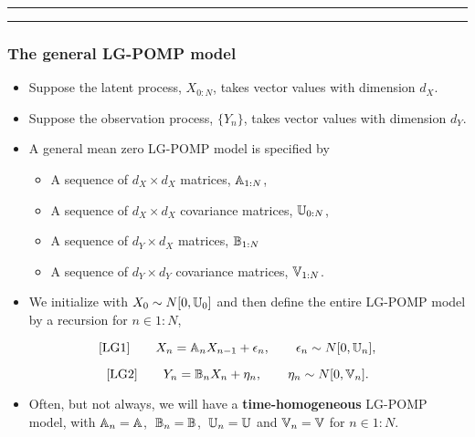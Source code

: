 \documentclass[]{article}
\providecommand{\tightlist}{%
  \setlength{\itemsep}{0pt}\setlength{\parskip}{0pt}}
\begin{document}
\begin{center}\rule{0.5\linewidth}{\linethickness}\end{center}

\begin{center}\rule{0.5\linewidth}{\linethickness}\end{center}

\subsubsection{The general LG-POMP
model}\label{the-general-lg-pomp-model}

\begin{itemize}
\item
  Suppose the latent process, \(X_{0:N}\), takes vector values with
  dimension \(d_X\).
\item
  Suppose the observation process, \(\{Y_n\}\), takes vector values with
  dimension \(d_Y\).
\item
  A general mean zero LG-POMP model is specified by

  \begin{itemize}
  \item
    A sequence of \(d_X\times d_X\) matrices, \(\mathbb{A}_{1:N}\),
  \item
    A sequence of \(d_X\times d_X\) covariance matrices,
    \(\mathbb{U}_{0:N}\),
  \item
    A sequence of \(d_Y\times d_X\) matrices, \(\mathbb{B}_{1:N}\)
  \item
    A sequence of \(d_Y\times d_Y\) covariance matrices,
    \(\mathbb{V}_{1:N}\).
  \end{itemize}
\item
  We initialize with \(X_0\sim N[0,\mathbb{U}_0]\) and then define the
  entire LG-POMP model by a recursion for \(n\in 1:N\),
\end{itemize}

$$\text{[LG1]} \quad\quad X_{n} = \mathbb{A}_n X_{n-1} + \epsilon_n,
\quad\quad \epsilon_n\sim N[0,\mathbb{U}_n],$$

$$\text{[LG2]} \quad\quad Y_{n} = \mathbb{B}_n X_n + \eta_n,
\quad\quad \eta_n\sim N[0,\mathbb{V}_n].$$

\begin{itemize}
\tightlist
\item
  Often, but not always, we will have a \textbf{time-homogeneous}
  LG-POMP model, with \(\mathbb{A}_n=\mathbb{A}\), \(\;\mathbb{B}_n=\mathbb{B}\),
  \(\;\mathbb{U}_n=\mathbb{U}\) and \(\mathbb{V}_n=\mathbb{V}\) for
  \(n\in 1:N\).
\end{itemize}
\end{document}
